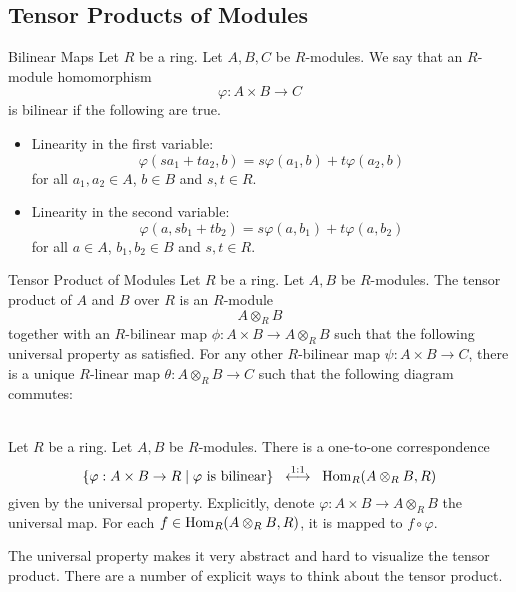 \documentclass[a4paper]{article}
\begin{document}
\subsection{Tensor Products of Modules}
\begin{defn}{Bilinear Maps}{} Let $R$ be a ring. Let $A,B,C$ be $R$-modules. We say that an $R$-module homomorphism $$\varphi:A\times B\to C$$ is bilinear if the following are true. 
\begin{itemize}
\item Linearity in the first variable: $$\varphi(sa_1+ta_2,b)=s\varphi(a_1,b)+t\varphi(a_2,b)$$ for all $a_1,a_2\in A$, $b\in B$ and $s,t\in R$. 
\item Linearity in the second variable: $$\varphi(a,sb_1+tb_2)=s\varphi(a,b_1)+t\varphi(a,b_2)$$ for all $a\in A$, $b_1,b_2\in B$ and $s,t\in R$. 
\end{itemize}
\end{defn}

\begin{defn}{Tensor Product of Modules}{} Let $R$ be a ring. Let $A,B$ be $R$-modules. The tensor product of $A$ and $B$ over $R$ is an $R$-module $$A\otimes_R B$$ together with an $R$-bilinear map $\phi:A\times B\to A\otimes_RB$ such that the following universal property as satisfied. For any other $R$-bilinear map $\psi:A\times B\to C$, there is a unique $R$-linear map $\theta:A\otimes_RB\to C$ such that the following diagram commutes: \\~\\
\end{defn}

\begin{prp}{}{} Let $R$ be a ring. Let $A,B$ be $R$-modules. There is a one-to-one correspondence $$\left\{\varphi:A\times B\to R\;|\;\varphi\text{ is bilinear}\right\}\;\;\overset{1:1}{\longleftrightarrow}\;\;\operatorname{Hom}_R(A\otimes_RB,R)$$ given by the universal property. Explicitly, denote $\varphi:A\times B\to A\otimes_R B$ the universal map. For each $f\in\operatorname{Hom}_R(A\otimes_RB,R)$, it is mapped to $f\circ\varphi$. 
\end{prp}

The universal property makes it very abstract and hard to visualize the tensor product. There are a number of explicit ways to think about the tensor product. 
\end{document}
